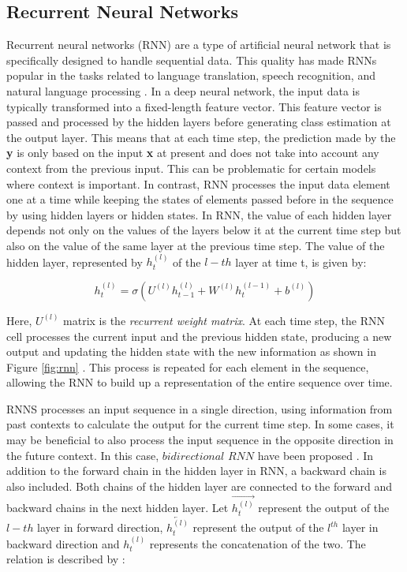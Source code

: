 \subsection{Recurrent Neural Networks}

Recurrent neural networks (RNN) are a type of artificial neural network that is specifically designed to handle sequential data. This quality has made RNNs popular in the tasks related to language translation, speech recognition, and natural language processing \cite{datta2020neural, sak2014long, makino2019recurrent, chernykh2017emotion, zhang2021attention, parascandolo2016recurrent, kerkeni2019automatic, kerkeni2019automatic2}. In a deep neural network, the input data is typically transformed into a fixed-length feature vector. This feature vector is passed and processed by the hidden layers before generating class estimation at the output layer. This means that at each time step, the prediction made by the \textbf{y} is only based on the input \textbf{x} at present and does not take into account any context from the previous input. This can be problematic for certain models where context is important. 
In contrast, RNN processes the input data element one at a time while keeping the states of elements passed before in the sequence by using hidden layers or hidden states. In RNN, the value of each hidden layer depends not only on the values of the layers below it at the current time step but also on the value of the same layer at the previous time step. 
The value of the hidden layer, represented by $h_t^{(l)}$ of the $l-th$ layer at time t, is given by:

\begin{equation}
    \label{eq:rnn}
    h_t^{(l)} = \sigma (U^{(l)} h_{t-1}^{(l)} + W^{(l)}h_{t}^{(l-1)} + b^{(l)})
\end{equation}

Here, $U^{(l)}$ matrix is the \textit{recurrent weight matrix}. At each time step, the RNN cell processes the current input and the previous hidden state, producing a new output and updating the hidden state with the new information as shown in Figure \ref{fig:rnn} \cite{colah_2015}. This process is repeated for each element in the sequence, allowing the RNN to build up a representation of the entire sequence over time.


RNNS processes an input sequence in a single direction, using information from past contexts to calculate the output for the current time step. In some cases, it may be beneficial to also process the input sequence in the opposite direction in the future context. In this case, $\textit{bidirectional RNN}$ have been proposed \cite{schuster1997bidirectional}. In addition to the forward chain in the hidden layer in RNN, a backward chain is also included. Both chains of the hidden layer are connected to the  forward and backward chains in the next hidden layer. Let $\overrightarrow{h_t^{(l)}}$ represent the output of the $l-th$ layer in forward direction, $\overleftarrow{h_t^{(l)}}$ represent the output of the $l^{th}$ layer in backward direction and $h_{t}^{(l)}$ represents the concatenation of the two. The relation is described by :

